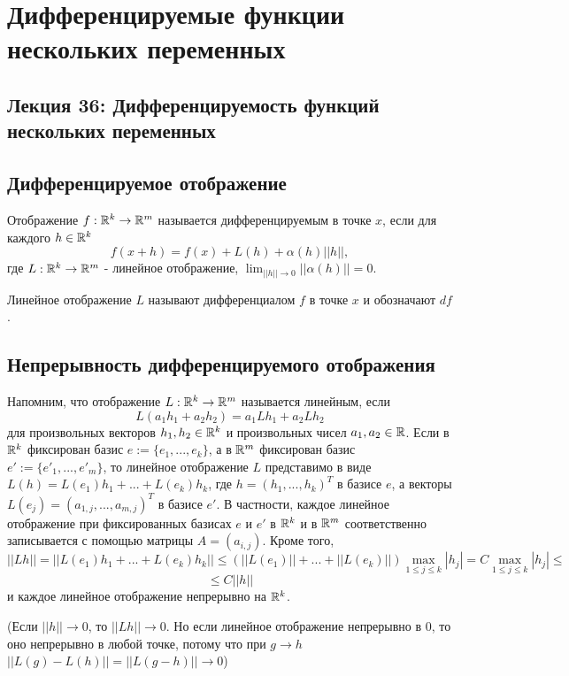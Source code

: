     \chapter{Дифференцируемые функции нескольких переменных}
    
    \section*{Лекция 36: Дифференцируемость функций нескольких переменных}
    
    \section{Дифференцируемое отображение}
    
    \begin{definition}
    	Отображение $f : \mathbb R^k \rightarrow \mathbb R^m$ называется  дифференцируемым в точке $x$, если для каждого $h \in \mathbb R^k$
    	\[ f(x + h) = f(x) + L(h) + \alpha(h) ||h||, \]
    	где $L: \mathbb R^k \rightarrow \mathbb R^m$ - линейное отображение, $\displaystyle \lim_{||h|| \rightarrow 0} ||\alpha(h)|| = 0$.
    	
    	Линейное отображение $L$ называют дифференциалом $f$ в точке $x$ и обозначают $df$.
    \end{definition}
    
    \section{Непрерывность дифференцируемого отображения}
    
    \begin{mention}
    	Напомним, что отображение $L: \mathbb R^k \rightarrow \mathbb R^m$ называется линейным, если
    	\[ L(a_1 h_1 + a_2 h_2) = a_1 Lh_1 + a_2Lh_2 \]    	
    	для произвольных векторов $h_1, h_2 \in \mathbb R^k$ и произвольных чисел $a_1, a_2 \in \mathbb R$. Если в $\mathbb R^k$ фиксирован базис $e := \{e_1, ..., e_k\}$, а в $\mathbb R^m$ фиксирован базис $e' := \{e'_1, ..., e'_m\}$, то линейное отображение $L$ представимо в виде $L(h) = L(e_1)h_1 + ... + L(e_k)h_k$, где $h = (h_1, ..., h_k)^T$ в базисе $e$, а векторы $L(e_j) = (a_{1, j}, ..., a_{m, j})^T$ в базисе $e'$. В частности, каждое линейное отображение при фиксированных базисах $e$ и $e'$ в $\mathbb R^k$ и в $\mathbb R^m$ соответственно записывается с помощью матрицы $A = (a_{i, j})$. Кроме того,
    	\[ ||Lh|| = ||L(e_1)h_1 + ... + L(e_k)h_k|| \leqslant (||L(e_1)|| + ... + ||L(e_k)||) \max_{1 \leqslant j \leqslant k} |h_j| = C \max_{1 \leqslant j \leqslant k} |h_j| \leqslant \]
    	\[ \leqslant C ||h|| \]
    	и каждое линейное отображение непрерывно на $\mathbb R^k$.
    	
    	(Если $||h|| \to 0$, то $||Lh|| \to 0$. Но если линейное отображение непрерывно в 0, то оно непрерывно в любой точке, потому что при $g \to h$ $||L(g) - L(h)|| = ||L(g - h)|| \to 0$)
    \end{mention}
    
